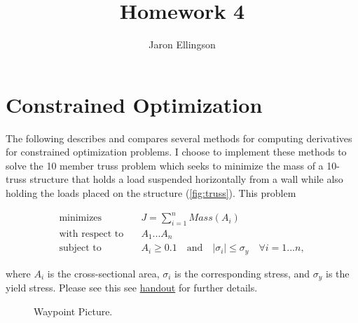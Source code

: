\documentclass{article}
\begin{document}
\title{Homework 4}
\author{Jaron Ellingson}
\maketitle


\section*{Constrained Optimization}

The following describes and compares several methods for computing derivatives for constrained optimization problems. I choose to implement these methods to solve the 10 member truss problem which seeks to minimize the mass of a 10-truss structure that holds a load suspended horizontally from a wall  while also holding the loads placed on the structure (\cref{fig:truss}). This problem 

\begin{equation*}
\begin{aligned}
\text{minimizes} & \quad J= \sum_{i=1}^{n} Mass(A_i) \\
\text{with respect to} & \quad A_1 ... A_{n} \\
\text{subject to} & \quad A_i \ge 0.1 \quad \text{and} \quad | \sigma_i | \le \sigma_y \quad \forall i=1 ... n,
\end{aligned}
\end{equation*}

where $A_i$ is the cross-sectional area, $\sigma_i$ is the corresponding stress, and $\sigma_y$ is the yield stress. Please see this see \href{https://byu.box.com/shared/static/h8gzy7nuzzk42ta7388y1luj3yhgsltq.pdf}{handout} for further details.


\begin{figure}
	\centering
	
	
	
	
	
	\caption{Waypoint Picture.}
	\label{fig:combined_radars}
	
\end{figure}
\end{document}
